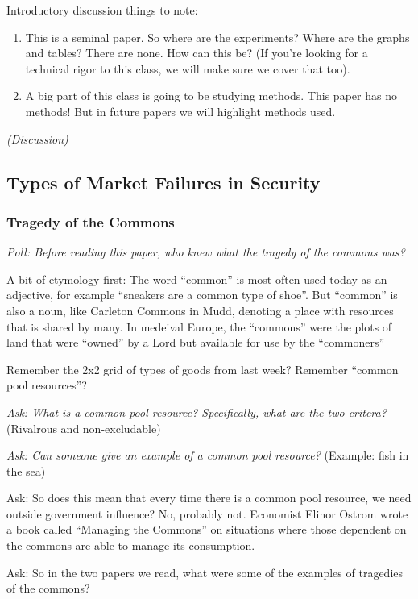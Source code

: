 \documentclass[11pt]{article}
\begin{document}
Introductory discussion things to note:
\begin{enumerate}
    \item This is a seminal paper. So where are the experiments? Where are the graphs and tables? There are none. How can this be? (If you're looking for a technical rigor to this class, we will make sure we cover that too).
    \item A big part of this class is going to be studying methods. This paper has no methods! But in future papers we will highlight methods used. 
\end{enumerate}

{\it (Discussion)}


\subsection{Types of Market Failures in Security}

\subsubsection{Tragedy of the Commons}

{\it Poll: Before reading this paper, who knew what the tragedy of the commons was?}

A bit of etymology first: The word ``common'' is most often used today as an adjective, for example ``sneakers are a common type of shoe''.
But ``common'' is also a noun, like Carleton Commons in Mudd, denoting a place with resources that is shared by many. In medeival Europe, the ``commons'' were the plots of land that were ``owned'' by a Lord but available for use by the ``commoners''

Remember the 2x2 grid of types of goods from last week? Remember ``common pool resources''?

{\it Ask: What is a common pool resource? Specifically, what are the two critera?} (Rivalrous and non-excludable)

{\it Ask: Can someone give an example of a common pool resource?} (Example: fish in the sea)

{Ask: So does this mean that every time there is a common pool resource, we need outside government influence?} No, probably not. Economist Elinor Ostrom wrote a book called ``Managing the Commons'' on situations where those dependent on the commons are able to manage its consumption.

{Ask: So in the two papers we read, what were some of the examples of tragedies of the commons?}
\end{document}
